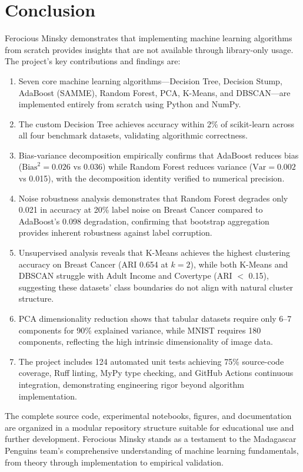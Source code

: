 \documentclass[conference,12pt]{IEEEtran}
\begin{document}
\section{Conclusion}

Ferocious Minsky demonstrates that implementing machine learning algorithms from scratch provides insights that are not available through library-only usage. The project's key contributions and findings are:

\begin{enumerate}
    \item Seven core machine learning algorithms---Decision Tree, Decision Stump, AdaBoost (SAMME), Random Forest, PCA, K-Means, and DBSCAN---are implemented entirely from scratch using Python and NumPy.
    \item The custom Decision Tree achieves accuracy within 2\% of scikit-learn across all four benchmark datasets, validating algorithmic correctness.
    \item Bias-variance decomposition empirically confirms that AdaBoost reduces bias ($\text{Bias}^2 = 0.026$ vs 0.036) while Random Forest reduces variance ($\text{Var} = 0.002$ vs 0.015), with the decomposition identity verified to numerical precision.
    \item Noise robustness analysis demonstrates that Random Forest degrades only 0.021 in accuracy at 20\% label noise on Breast Cancer compared to AdaBoost's 0.098 degradation, confirming that bootstrap aggregation provides inherent robustness against label corruption.
    \item Unsupervised analysis reveals that K-Means achieves the highest clustering accuracy on Breast Cancer (ARI 0.654 at $k=2$), while both K-Means and DBSCAN struggle with Adult Income and Covertype (ARI $<$ 0.15), suggesting these datasets' class boundaries do not align with natural cluster structure.
    \item PCA dimensionality reduction shows that tabular datasets require only 6--7 components for 90\% explained variance, while MNIST requires 180 components, reflecting the high intrinsic dimensionality of image data.
    \item The project includes 124 automated unit tests achieving 75\% source-code coverage, Ruff linting, MyPy type checking, and GitHub Actions continuous integration, demonstrating engineering rigor beyond algorithm implementation.
\end{enumerate}

The complete source code, experimental notebooks, figures, and documentation are organized in a modular repository structure suitable for educational use and further development. Ferocious Minsky stands as a testament to the Madagascar Penguins team's comprehensive understanding of machine learning fundamentals, from theory through implementation to empirical validation.
\end{document}
